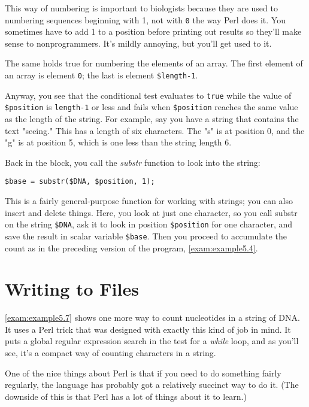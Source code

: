 This way of numbering is important to biologists because they are used to numbering sequences beginning with 1, not with \verb|0| the way Perl does it. You sometimes have to add 1 to a position before printing out results so they'll make sense to nonprogrammers. It's mildly annoying, but you'll get used to it.

The same holds true for numbering the elements of an array. The first element of an array is element \verb|0|; the last is element \verb|$length-1|.

Anyway, you see that the conditional test evaluates to \verb|true| while the value of \verb|$position| is \verb|length-1| or less and fails when \verb|$position| reaches the same value as the length of the string. For example, say you have a string that contains the text "seeing." This has a length of six characters. The "s" is at position 0, and the "g" is at position 5, which is one less than the string length 6.

Back in the block, you call the \textit{substr} function to look into the string: 

\begin{lstlisting}
$base = substr($DNA, $position, 1);
\end{lstlisting}

This is a fairly general-purpose function for working with strings; you can also insert and delete things. Here, you look at just one character, so you call substr on the string \verb|$DNA|, ask it to look in position \verb|$position| for one character, and save the result in scalar variable \verb|$base|. Then you proceed to accumulate the count as in the preceding version of the program, \autoref{exam:example5.4}. 

\section{Writing to Files}
\autoref{exam:example5.7} shows one more way to count nucleotides in a string of DNA.  It uses a Perl trick that was designed with exactly this kind of job in mind. It puts a global regular expression search in the test for a \textit{while} loop, and as you'll see, it's a compact way of counting characters in a string.

One of the nice things about Perl is that if you need to do something fairly regularly, the language has probably got a relatively succinct way to do it. (The downside of this is that Perl has a lot of things about it to learn.)

